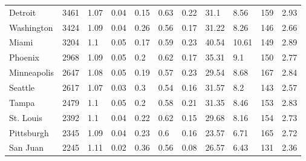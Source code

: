 \documentclass[Afour,sageh,times]{sagej}
\begin{document}
\begin{landscape}
\begin{table}
\begin{tabular}{p{2.5cm} p{1.5cm} p{1.5cm} p{1.5cm} p{1.55cm} p{1.5cm} p{1.5cm} p{1.5cm} p{1.5cm} p{1.5cm} p{1.5cm}}
Detroit              & 3461          & 1.07         & 0.04                       & 0.15           & 0.63        & 0.22        & 31.1                  & 8.56                  & 159                   & 2.93             \\
Washington           & 3424          & 1.09         & 0.04                       & 0.26           & 0.56        & 0.17        & 31.22                 & 8.26                  & 146                   & 2.66             \\
Miami                & 3204          & 1.1          & 0.05                       & 0.17           & 0.59        & 0.23        & 40.54                 & 10.61                 & 149                   & 2.89             \\
Phoenix              & 2968          & 1.09         & 0.05                       & 0.2            & 0.62        & 0.17        & 35.31                 & 9.1                   & 150                   & 2.77             \\
Minneapolis          & 2647          & 1.08         & 0.05                       & 0.19           & 0.57        & 0.23        & 29.54                 & 8.68                  & 167                   & 2.84             \\
Seattle              & 2617          & 1.07         & 0.03                       & 0.3            & 0.54        & 0.16        & 31.57                 & 8.2                   & 143                   & 2.57             \\
Tampa                & 2479          & 1.1          & 0.05                       & 0.2            & 0.58        & 0.21        & 31.35                 & 8.46                  & 153                   & 2.83             \\
St. Louis            & 2392          & 1.1          & 0.04                       & 0.22           & 0.62        & 0.15        & 29.68                 & 8.16                  & 154                   & 2.73             \\
Pittsburgh           & 2345          & 1.09         & 0.04                       & 0.23           & 0.6         & 0.16        & 23.57                 & 6.71                  & 165                   & 2.72             \\
San Juan             & 2245          & 1.11         & 0.02                       & 0.36           & 0.56        & 0.08        & 26.57                 & 6.43                  & 131                   & 2.36             \\

\end{tabular}
\end{table}
\end{landscape}
\end{document}
